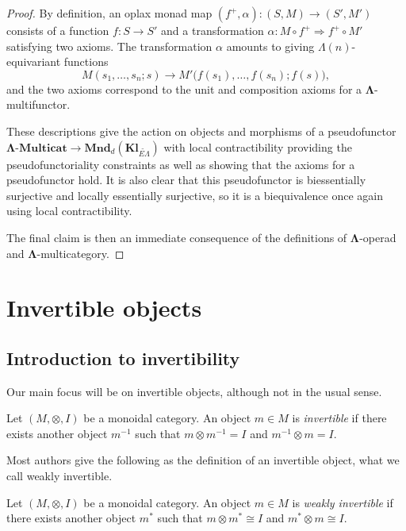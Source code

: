 \documentclass{amsbook} %
\newcommand{\mb}{\mathbf}
\numberwithin{section}{chapter}
\begin{document}
\begin{proof}
By definition, an oplax monad map $(f^{+}, \alpha): (S,M) \to (S', M')$ consists of a function $f:S \to S'$ and a transformation $\alpha: M \circ f^{+} \Rightarrow f^{+} \circ M'$ satisfying two axioms.  The transformation $\alpha$ amounts to giving $\Lambda(n)$-equivariant functions
\[
M(s_1, \ldots, s_n; s) \to M'\big(f(s_1), \ldots, f(s_n); f(s)\big),
\]
and the two axioms correspond to the unit and composition axioms for a $\mb{\Lambda}$-multifunctor.

These descriptions give the action on objects and morphisms of a pseudofunctor $\mb{\Lambda}\mbox{-}\mb{Multicat} \to \mb{Mnd}_{d}(\mb{Kl}_{\widetilde{E\Lambda}})$ with local contractibility providing the pseudofunctoriality constraints as well as showing that the axioms for a pseudofunctor hold.  It is also clear that this pseudofunctor is biessentially surjective and locally essentially surjective, so it is a biequivalence once again using local contractibility.

The final claim is then an immediate consequence of the definitions of $\mb{\Lambda}$-operad and $\mb{\Lambda}$-multicategory.
\end{proof}




\chapter{Invertible objects}

\section{Introduction to invertibility}

Our main focus will be on invertible objects, although not in the usual sense.
\begin{Defi}
Let $(M, \otimes, I)$ be a monoidal category. An object $m \in M$ is \emph{invertible} if there exists another object $m^{-1}$ such that $m \otimes m^{-1} = I$ and $m^{-1} \otimes m = I$.

\end{Defi}

Most authors give the following as the definition of an invertible object, what we call weakly invertible.
\begin{Defi}
Let $(M, \otimes, I)$ be a monoidal category. An object $m \in M$ is \emph{weakly invertible} if there exists another object $m^{*}$ such that $m \otimes m^{*} \cong I$ and $m^{*} \otimes m \cong I$.

\end{Defi}
\end{document}
